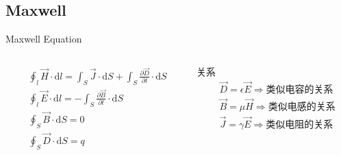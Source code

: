 \documentclass{beamer}
\begin{document}
\subsection{Maxwell}
\begin{frame}{Maxwell Equation}
  \begin{columns}
    \begin{column}{0.55\textwidth}
      \begin{align*}
        &\oint_l\vec{H}\cdot\mathrm{d}l=\int_S\vec{J}\cdot\mathrm{d}S+\int_S \frac{\partial\vec{D}}{\partial t}\cdot\mathrm{d}S \\
        &\oint_l\vec{E}\cdot\mathrm{d}l=-\int_S\frac{\partial\vec{B}}{\partial t}\cdot\mathrm{d}S \\
        &\oint_S\vec{B}\cdot\mathrm{d}S=0 \\
        &\oint_S\vec{D}\cdot\mathrm{d}S=q \\
      \end{align*}
    \end{column}
    \begin{column}{0.45\textwidth}
      \begin{block}{关系}
        \begin{align*}
          &\vec{D}=\epsilon\vec{E} \Rightarrow \mbox{类似电容的关系} \\
          &\vec{B}=\mu\vec{H} \Rightarrow \mbox{类似电感的关系} \\
          &\vec{J}=\gamma\vec{E} \Rightarrow \mbox{类似电阻的关系} \\
        \end{align*}
      \end{block}
    \end{column}
  \end{columns}
\end{frame}
\end{document}

